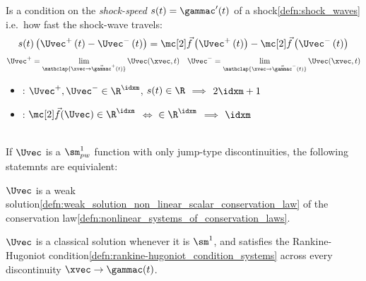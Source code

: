 \begin{defnbox}\nospacing
    \begin{defn}\label{defn:rankine-hugoniot_condition_systems}
        Is a condition on the \textit{shock-speed} $s(t)=\gammac'(t)$ of a shock\cref{defn:shock_waves} i.e.\ how fast the shock-wave travels:
        \begin{align}
          s(t)\left(\Uvec^{+}\left(t\right)-\Uvec^{-}\left(t\right)\right)=\fluxvec\left(\Uvec^{+}\left(t\right)\right)-\fluxvec\left(\Uvec^{-}\left(t\right)\right)
          \label{eq:rankine-hugoniot_condition_systems}
        \end{align}
        \begin{align*}
          \Uvec^{+}=\lim_{\mathclap{\xvec\to\vec{\gammac}^{+}(t)}}\Uvec(\xvec,t)&&\Uvec^{-}=\lim_{\mathclap{\xvec\to\vec{\gammac}^{-}(t)}}\Uvec(\xvec,t)
        \end{align*}
    \end{defn}
\end{defnbox}
\begin{corbox}\nospacing
    \begin{cor}\label{cor:unknowns_vs._equations}\leavevmode
        \begin{itemize}
            \item {}: $\Uvec^{+},\Uvec^{-}\in\R^{\idxm}$, $s(t)\in\R$ $\implies$ $2\idxm+1$
            \item {}: $\fluxvec(\Uvec)\in\R^{\idxm}$ $\iff$ $\in\R^{\idxm}$ $\implies$ $\idxm$
        \end{itemize}
    \end{cor}
\end{corbox}
\begin{corbox}\nospacing
    \begin{cor}\label{cor:relationship_to_weak_solutions}\leavevmode\\
        If $\Uvec$ is a $\sm_{pw}^{1}$ function with only jump-type discontinuities, the following statemnts are equivialent:
        \begin{itemizenosep}
            \item $\Uvec$ is a weak solution\cref{defn:weak_solution_non_linear_scalar_conservation_law} of the conservation law\cref{defn:nonlinear_systems_of_conservation_laws}.
            \item $\Uvec$ is a classical solution whenever it is $\sm^{1}$, and satisfies the Rankine-Hugoniot condition\cref{defn:rankine-hugoniot_condition_systems}
            across every discontinuity $\xvec\to\gammac(t)$.
        \end{itemizenosep}
    \end{cor}
\end{corbox}
